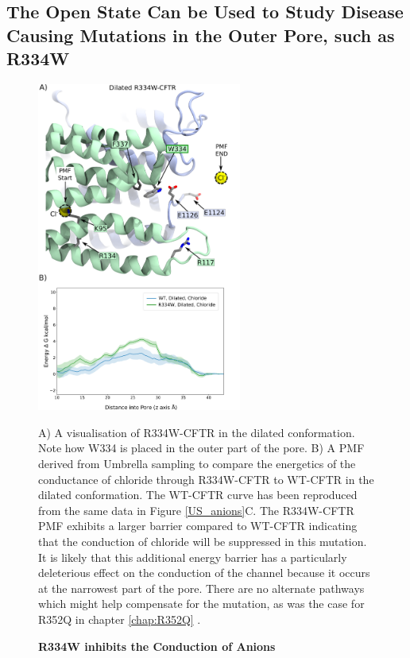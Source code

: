 \subsection{The Open State Can be Used to Study Disease Causing Mutations in the Outer Pore, such as R334W}


\begin{figure}
	\begin{center}
		\includegraphics[width=0.6\textwidth]{figures/opening/R334W_pmf_combined.pdf}
	\end{center}
	\captionsetup{singlelinecheck = false, justification=raggedright}
	\caption[R334W Inhibits the Conduction of Anions] {\textbf{R334W inhibits the Conduction of Anions}}{A) A visualisation of R334W-CFTR in the dilated conformation. Note how W334 is placed in the outer part of the pore. B) A PMF derived from Umbrella sampling to compare the energetics of the conductance of chloride through R334W-CFTR to WT-CFTR in the dilated conformation. The WT-CFTR curve has been reproduced from the same data in Figure \ref{US_anions}C. The R334W-CFTR PMF exhibits a larger barrier compared to WT-CFTR indicating that the conduction of chloride will be suppressed in this mutation. It is likely that this additional energy barrier has a particularly deleterious effect on the conduction of the channel because it occurs at the narrowest part of the pore. There are no alternate pathways which might help compensate for the mutation, as was the case for R352Q in chapter \ref{chap:R352Q} \cite{wong2022a}.  }
	\label{R334_pmf}
\end{figure}

